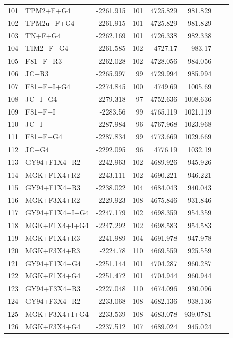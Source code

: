 \documentclass[fleqn,letterpaper]{article}
\begin{document}
\begin{longtable}{clrrrrrr}
	101 & TPM2+F+G4 & -2261.915 & 101 & 4725.829 & 981.829 \\ 
	102 & TPM2u+F+G4 & -2261.915 & 101 & 4725.829 & 981.829 \\ 
	103 & TN+F+G4 & -2262.169 & 101 & 4726.338 & 982.338 \\ 
	104 & TIM2+F+G4 & -2261.585 & 102 & 4727.17 & 983.17 \\ 
	105 & F81+F+R3 & -2262.028 & 102 & 4728.056 & 984.056 \\ 
	106 & JC+R3 & -2265.997 & 99 & 4729.994 & 985.994 \\ 
	107 & F81+F+I+G4 & -2274.845 & 100 & 4749.69 & 1005.69 \\ 
	108 & JC+I+G4 & -2279.318 & 97 & 4752.636 & 1008.636 \\ 
	109 & F81+F+I & -2283.56 & 99 & 4765.119 & 1021.119 \\ 
	110 & JC+I & -2287.984 & 96 & 4767.968 & 1023.968 \\ 
	111 & F81+F+G4 & -2287.834 & 99 & 4773.669 & 1029.669 \\ 
	112 & JC+G4 & -2292.095 & 96 & 4776.19 & 1032.19 \\ 
	113 & GY94+F1X4+R2 & -2242.963 & 102 & 4689.926 & 945.926 \\ 
	114 & MGK+F1X4+R2 & -2243.111 & 102 & 4690.221 & 946.221 \\ 
	115 & GY94+F1X4+R3 & -2238.022 & 104 & 4684.043 & 940.043 \\ 
	116 & MGK+F3X4+R2 & -2229.923 & 108 & 4675.846 & 931.846 \\ 
	117 & GY94+F1X4+I+G4 & -2247.179 & 102 & 4698.359 & 954.359 \\ 
	118 & MGK+F1X4+I+G4 & -2247.292 & 102 & 4698.583 & 954.583 \\ 
	119 & MGK+F1X4+R3 & -2241.989 & 104 & 4691.978 & 947.978 \\ 
	120 & MGK+F3X4+R3 & -2224.78 & 110 & 4669.559 & 925.559 \\ 
	121 & GY94+F1X4+G4 & -2251.144 & 101 & 4704.287 & 960.287 \\ 
	122 & MGK+F1X4+G4 & -2251.472 & 101 & 4704.944 & 960.944 \\ 
	123 & GY94+F3X4+R3 & -2227.048 & 110 & 4674.096 & 930.096 \\ 
	124 & GY94+F3X4+R2 & -2233.068 & 108 & 4682.136 & 938.136 \\ 
	125 & MGK+F3X4+I+G4 & -2233.539 & 108 & 4683.078 & 939.0781 \\ 
	126 & MGK+F3X4+G4 & -2237.512 & 107 & 4689.024 & 945.024 \\ 

\end{longtable}
\end{document}
